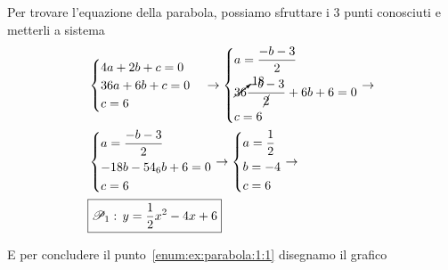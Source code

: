 Per trovare l'equazione della parabola, possiamo sfruttare i 3 punti conosciuti e metterli a sistema
\begin{align*}
  &\begin{cases}
  4a+2b+c=0\\
  36a+6b+c=0\\
  c=6
\end{cases}\rightarrow
\begin{dcases}
  a = \frac{-b-3}{2}\\
  \cancelto{18}{36}\frac{-b-3}{\cancel{2}}+6b+6=0\\
  c=6
\end{dcases}\rightarrow\\
&\begin{dcases}
a = \frac{-b-3}{2}\\
-18b-54_6b+6=0\\
c=6
\end{dcases}\rightarrow
\begin{dcases}
  a = \frac{1}{2}\\
  b = -4\\
  c = 6
\end{dcases} \rightarrow\\ &\boxed{\mathscr{P}_1:\,y=\frac{1}{2}x^2-4x+6}
\end{align*}

E per concludere il punto~\ref{enum:ex:parabola:1:1} disegnamo il grafico
\begin{center}
\end{center}

